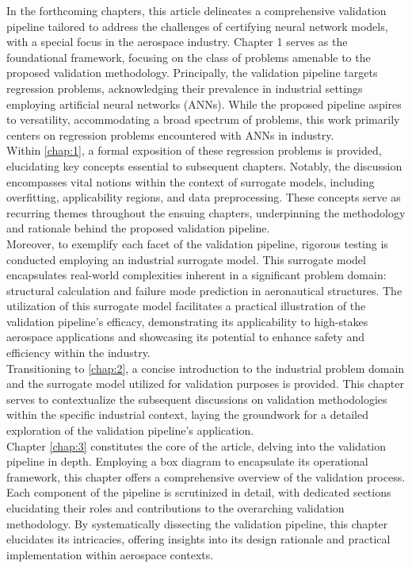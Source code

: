\indent In the forthcoming chapters, this article delineates a comprehensive validation pipeline tailored to address the challenges of certifying neural network models, with a special focus in the aerospace industry. Chapter 1 serves as the foundational framework, focusing on the class of problems amenable to the proposed validation methodology. Principally, the validation pipeline targets regression problems, acknowledging their prevalence in industrial settings employing artificial neural networks (ANNs). While the proposed pipeline aspires to versatility, accommodating a broad spectrum of problems, this work primarily centers on regression problems encountered with ANNs in industry.\\
%
\indent Within \autoref{chap:1}, a formal exposition of these regression problems is provided, elucidating key concepts essential to subsequent chapters. Notably, the discussion encompasses vital notions within the context of surrogate models, including overfitting, applicability regions, and data preprocessing. These concepts serve as recurring themes throughout the ensuing chapters, underpinning the methodology and rationale behind the proposed validation pipeline.\\
%
\indent Moreover, to exemplify each facet of the validation pipeline, rigorous testing is conducted employing an industrial surrogate model. This surrogate model encapsulates real-world complexities inherent in a significant problem domain: structural calculation and failure mode prediction in aeronautical structures. The utilization of this surrogate model facilitates a practical illustration of the validation pipeline's efficacy, demonstrating its applicability to high-stakes aerospace applications and showcasing its potential to enhance safety and efficiency within the industry.\\
%
\indent Transitioning to \autoref{chap:2}, a concise introduction to the industrial problem domain and the surrogate model utilized for validation purposes is provided. This chapter serves to contextualize the subsequent discussions on validation methodologies within the specific industrial context, laying the groundwork for a detailed exploration of the validation pipeline's application.\\
%
\indent Chapter \ref{chap:3} constitutes the core of the article, delving into the validation pipeline in depth. Employing a box diagram to encapsulate its operational framework, this chapter offers a comprehensive overview of the validation process. Each component of the pipeline is scrutinized in detail, with dedicated sections elucidating their roles and contributions to the overarching validation methodology. By systematically dissecting the validation pipeline, this chapter elucidates its intricacies, offering insights into its design rationale and practical implementation within aerospace contexts.\\
